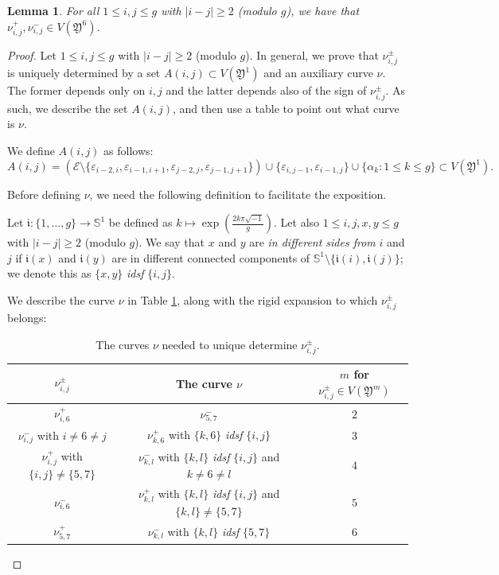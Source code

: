 \documentclass{artv3}
\newtheorem{lemma}[theorem]{Lemma}
\newcommand*{\veps}{\varepsilon}
\newcommand{\E}{\mathcal{E}}
\newcommand*{\Y}{\mathfrak{Y}}
\begin{document}
\begin{lemma}\label{lemma:nupmij}
 For all $1 \leq i,j \leq g$ with $|i-j|\geq 2$ (modulo $g$), we have that $\nu^{+}_{i,j}, \nu^{-}_{i,j} \in V(\Y^{6})$.
\end{lemma}
\begin{proof}
Let $1 \leq i,j \leq g$ with $|i-j|\geq 2$ (modulo $g$). In general, we prove that $\nu^{\pm}_{i,j}$ is uniquely determined by a set $A(i,j) \subset V(\Y^{1})$ and an auxiliary curve $\nu$. The former depends only on $i,j$ and the latter depends also of the sign of $\nu^{\pm}_{i,j}$. As such, we describe the set $A(i,j)$, and then use a table to point out what curve is $\nu$.

We define $A(i,j)$ as follows: $$A(i,j) = (\E \setminus \{\veps_{i-2,i},\veps_{i-1,i+1},\veps_{j-2,j},\veps_{j-1,j+1}\}) \cup \{\veps_{i,j-1},\veps_{i-1,j}\} \cup \{\alpha_{k} : 1 \leq k \leq g\} \subset V(\Y^{1}).$$

Before defining $\nu$, we need the following definition to facilitate the exposition.

Let $\mathfrak{i}: \{1, \ldots, g\} \to \mathbb{S}^{1}$ be defined as $k \mapsto \exp(\frac{2k\pi \sqrt{-1}}{g})$. Let also $1 \leq i,j,x,y \leq g$ with $|i-j|\geq 2$ (modulo $g$). We say that $x$ and $y$ are \textit{in different sides from} $i$ and $j$ if $\mathfrak{i}(x)$ and $\mathfrak{i}(y)$ are in different connected components of $\mathbb{S}^{1} \setminus \{\mathfrak{i}(i), \mathfrak{i}(j)\}$; we denote this as $\{x,y\}$ \emph{idsf} $\{i,j\}$.

We describe the curve $\nu$ in Table \ref{table:nu}, along with the rigid expansion to which $\nu^{\pm}_{i,j}$ belongs:

\begin{table}[ht]
 \centering
 \begin{tabular}{|c|c|c|}
  \hline
  $\nu^{\pm}_{i,j}$ & The curve $\nu$ & $m$ for $\nu^{\pm}_{i,j} \in V(\Y^{m})$\\ \hline
  $\nu^{+}_{i,6}$ & $\nu^{-}_{5,7}$ & $2$\\ \hline
  $\nu^{-}_{i,j}$ with $i \neq 6 \neq j$ & $\nu^{+}_{k,6}$ with $\{k,6\}$ \emph{idsf} $\{i,j\}$ & $3$\\ \hline
  $\nu^{+}_{i,j}$ with $\{i,j\} \neq \{5,7\}$ & $\nu^{-}_{k,l}$ with $\{k,l\}$ \emph{idsf} $\{i,j\}$ and $k \neq 6 \neq l$ & $4$\\ \hline
  $\nu^{-}_{i,6}$ & $\nu^{+}_{k,l}$ with $\{k,l\}$ \emph{idsf} $\{i,j\}$ and $\{k,l\}\neq\{5,7\}$ & $5$\\ \hline
  $\nu^{+}_{5,7}$ & $\nu^{-}_{k,l}$ with $\{k,l\}$ \emph{idsf} $\{5,7\}$ & $6$\\ \hline
 \end{tabular}
 \caption{The curves $\nu$ needed to unique determine $\nu^{\pm}_{i,j}$.}\label{table:nu}
\end{table}


\end{proof}
\end{document}
